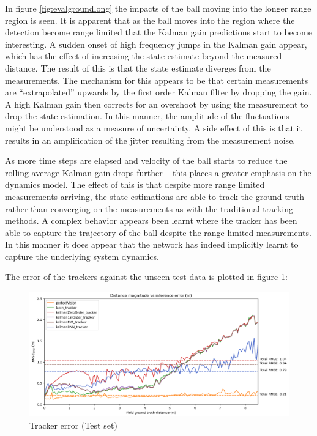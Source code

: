 \documentclass[a4paper,twoside,12pt]{report}
\begin{document}
In figure \ref{fig:evalgroundlong} the impacts of the ball moving into the longer range region is seen. It is apparent that as the ball moves into the region where the detection become range limited that the Kalman gain predictions start to become interesting. A sudden onset of high frequency jumps in the Kalman gain appear, which has the effect of increasing the state estimate beyond the measured distance. The result of this is that the state estimate diverges from the measurements. The mechanism for this appears to be that certain measurements are ``extrapolated'' upwards by the first order Kalman filter by dropping the gain. A high Kalman gain then corrects for an overshoot by using the measurement to drop the state estimation. In this manner, the amplitude of the fluctuations might be understood as a measure of uncertainty. A side effect of this is that it results in an amplification of the jitter resulting from the measurement noise.

As more time steps are elapsed and velocity of the ball starts to reduce the rolling average Kalman gain drops further -- this places a greater emphasis on the dynamics model. The effect of this is that despite more range limited measurements arriving, the state estimations are able to track the ground truth rather than converging on the measurements as with the traditional tracking methods. A complex behavior appears been learnt where the tracker has been able to capture the trajectory of the ball despite the range limited measurements. In this manner it does appear that the network has indeed implicitly learnt to capture the underlying system dynamics. 

The error of the trackers against the unseen test data is plotted in figure \ref{fig:evalerror}:

\begin{figure}[h!]
\begin{center}
\includegraphics[width=13cm]{images/eval_error.png}
\caption{Tracker error (Test set)}
\label{fig:evalerror}
\end{center}
\end{figure}
\end{document}
